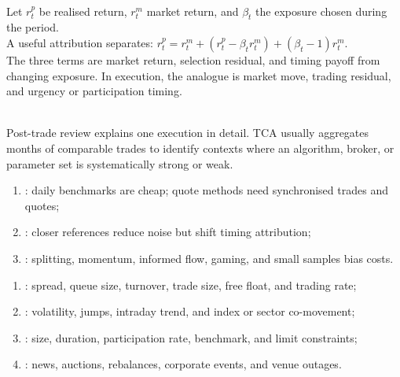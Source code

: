 \begin{model} \\
Let $r^p_t$ be realised return, $r^m_t$ market return, and $\beta_t$ the exposure chosen during the period.\\
A useful attribution separates: $r^p_t = r^m_t + (r^p_t-\beta_t r^m_t)+(\beta_t-1)r^m_t$.\\
The three terms are market return, selection residual, and timing payoff from changing exposure. In execution, the analogue is market move, trading residual, and urgency or participation timing.
\end{model}

\begin{caveat} \\
Post-trade review explains one execution in detail. TCA usually aggregates months of comparable trades to identify contexts where an algorithm, broker, or parameter set is systematically strong or weak.
\end{caveat}

\begin{taxonomy} 
\begin{enumerate}[label=\roman*.]
\setlength{\itemsep}{0pt}
\item {}: daily benchmarks are cheap; quote methods need synchronised trades and quotes;
\item {}: closer references reduce noise but shift timing attribution;
\item {}: splitting, momentum, informed flow, gaming, and small samples bias costs.
\end{enumerate}
\end{taxonomy}

\begin{taxonomy} 
\begin{enumerate}[label=\roman*.]
\setlength{\itemsep}{0pt}
\item {}: spread, queue size, turnover, trade size, free float, and trading rate;
\item {}: volatility, jumps, intraday trend, and index or sector co-movement;
\item {}: size, duration, participation rate, benchmark, and limit constraints;
\item {}: news, auctions, rebalances, corporate events, and venue outages.
\end{enumerate}
\end{taxonomy}

